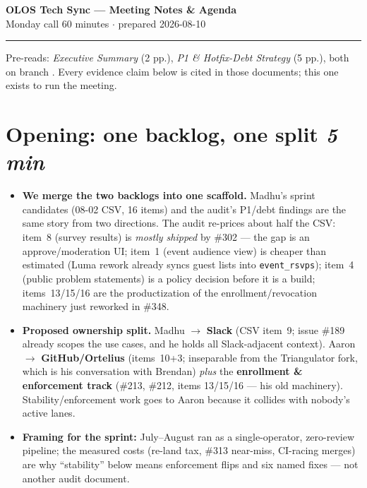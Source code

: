 \documentclass[10pt]{article}
\newcommand{\gh}[1]{\mbox{\##1}}
\newcommand{\tbox}[1]{\hfill {\normalsize\normalfont\itshape #1}}
\begin{document}
{\LARGE\bfseries OLOS Tech Sync --- Meeting Notes \& Agenda}\\[2pt]
{\large Monday call \hfill \normalsize 60 minutes $\cdot$ prepared 2026-08-10}

\vspace{2pt}\hrule\vspace{6pt}

{\footnotesize Pre-reads: \emph{Executive Summary} (2 pp.), \emph{P1 \& Hotfix-Debt Strategy} (5 pp.), both on branch . Every evidence claim below is cited in those documents; this one exists to run the meeting.}

\section{Opening: one backlog, one split \tbox{5 min}}
\begin{itemize}
  \item \textbf{We merge the two backlogs into one scaffold.} Madhu's sprint candidates (08-02 CSV, 16 items) and the audit's P1/debt findings are the same story from two directions. The audit re-prices about half the CSV: item~8 (survey results) is \emph{mostly shipped} by \gh{302} --- the gap is an approve/moderation UI; item~1 (event audience view) is cheaper than estimated (Luma rework already syncs guest lists into \texttt{event\_rsvps}); item~4 (public problem statements) is a policy decision before it is a build; items~13/15/16 are the productization of the enrollment/revocation machinery just reworked in \gh{348}.
  \item \textbf{Proposed ownership split.} Madhu $\rightarrow$ \textbf{Slack} (CSV item~9; issue \gh{189} already scopes the use cases, and he holds all Slack-adjacent context). Aaron $\rightarrow$ \textbf{GitHub/Ortelius} (items~10+3; inseparable from the Triangulator fork, which is his conversation with Brendan) \emph{plus} the \textbf{enrollment \& enforcement track} (\gh{213}, \gh{212}, items 13/15/16 --- his old machinery). Stability/enforcement work goes to Aaron because it collides with nobody's active lanes.
  \item \textbf{Framing for the sprint:} July--August ran as a single-operator, zero-review pipeline; the measured costs (re-land tax, \gh{313} near-miss, CI-racing merges) are why ``stability'' below means enforcement flips and six named fixes --- not another audit document.
\end{itemize}
\end{document}
